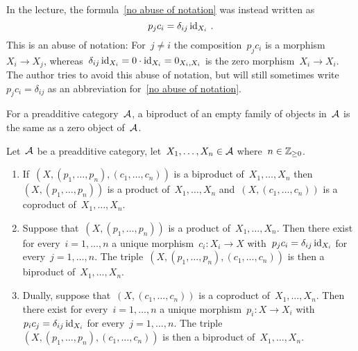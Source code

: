 \begin{remark*}
  In the lecture, the formula~\ref{no abuse of notation} was instead written as
  \[
      p_j c_i
    = \delta_{ij} \operatorname{id}_{X_i} \,.
  \]
  This is an abuse of notation:
  For~$j \neq i$ the composition~$p_j c_i$ is a morphism~$X_i \to X_j$, whereas~$\delta_{ij} \operatorname{id}_{X_i} = 0 \cdot \operatorname{id}_{X_i} = 0_{X_i, X_i}$ is the zero morphism~$X_i \to X_i$.
  The author tries to avoid this abuse of notation, but will still sometimes write~$p_j c_i = \delta_{ij}$ as an abbreviation for~\eqref{no abuse of notation}.
\end{remark*}


\begin{remark*}
  For a preadditive category~$\mathcal{A}$, a biproduct of an empty family of objects in~$\mathcal{A}$ is the same as a zero object of~$\mathcal{A}$.
\end{remark*}


\begin{lemma}
  \label{product coproduct biproduct}
  Let~$\mathcal{A}$ be a preadditive category, let~$X_1, \dotsc, X_n \in \mathcal{A}$ where~$n \in \mathbb{Z}_{\geq 0}$.
  \begin{enumerate}
    \item
      If~$(X, (p_1, \dotsc, p_n), (c_1, \dotsc, c_n))$ is a biproduct of~$X_1, \dotsc, X_n$ then~$(X, (p_1, \dotsc, p_n))$ is a product of~$X_1, \dotsc, X_n$ and~$(X, (c_1, \dotsc, c_n))$ is a coproduct of~$X_1, \dotsc, X_n$.
    \item
      \label{products into biproducts}
      Suppose that~$(X, (p_1, \dotsc, p_n))$ is a product of~$X_1, \dotsc, X_n$.
      Then there exist for every~$i = 1, \dotsc, n$ a unique morphism~$c_i \colon X_i \to X$ with~$p_j c_i = \delta_{ij} \operatorname{id}_{X_i}$ for every~$j = 1, \dotsc, n$.
      The triple~$(X, (p_1, \dotsc, p_n), (c_1, \dotsc, c_n))$ is then a biproduct of~$X_1, \dotsc, X_n$.
    \item
      Dually, suppose that~$(X, (c_1, \dotsc, c_n))$ is a coproduct of~$X_1, \dotsc, X_n$.
      Then there exist for every~$i = 1, \dotsc, n$ a unique morphism~$p_i \colon X \to X_i$ with~$p_i c_j = \delta_{ij} \operatorname{id}_{X_i}$ for every~$j = 1, \dotsc, n$.
      The triple~$(X, (p_1, \dotsc, p_n), (c_1, \dotsc, c_n))$ is then a biproduct of~$X_1, \dotsc, X_n$.
  \end{enumerate}
\end{lemma}


